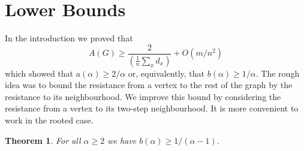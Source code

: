 \documentclass[11pt]{article}
\newtheorem{theorem}{Theorem}
\theoremstyle{remark}
\def\a{\alpha}
\begin{document}
\section{Lower Bounds}\label{s:lower}

In the introduction we proved that 
\[
A(G)\ge \frac{2}{(\frac 1n\sum_xd_x)}+O(m/n^2)
\]
which showed that $a(\alpha)\ge 2/\alpha$ or, equivalently, that $b(\a)\ge
1/\a$. The rough idea was to bound the resistance from a vertex to the
rest of the graph by the resistance to its neighbourhood. We improve
this bound by considering the resistance from a vertex to its two-step
neighbourhood. It is more convenient to work in the rooted case.

\begin{theorem}\label{t:2-step-lower}
For all $\a\ge 2$ we have  $b(\alpha)\ge 1/(\alpha-1)$.
\end{theorem}
\end{document}
